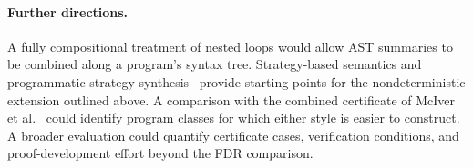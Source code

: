 \paragraph{Further directions.}
A fully compositional treatment of nested loops would allow AST summaries to be combined along a program's syntax tree. Strategy-based semantics and programmatic strategy synthesis~\cite{DBLP:journals/pacmpl/BatzBKW24} provide starting points for the nondeterministic extension outlined above. A comparison with the combined certificate of McIver et al.~\cite{10.1145/3158121} could identify program classes for which either style is easier to construct. A broader evaluation could quantify certificate cases, verification conditions, and proof-development effort beyond the FDR comparison.
